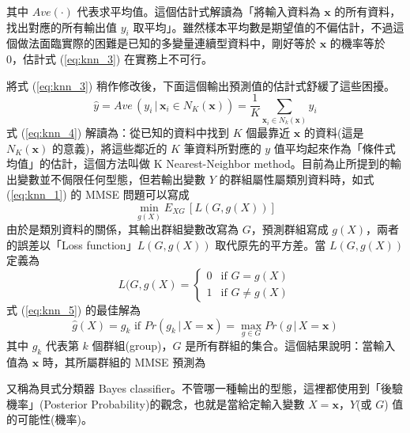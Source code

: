 其中 $Ave(·)$ 代表求平均值。這個估計式解讀為「將輸入資料為 $\mathbf{x}$ 的所有資料，找出對應的所有輸出值 $y_i$ 取平均」。雖然樣本平均數是期望值的不偏估計，不過這個做法面臨實際的困難是已知的多變量連續型資料中，剛好等於 $\mathbf{x}$ 的機率等於 0，估計式 (\ref{eq:knn_3}) 在實務上不可行。

將式 (\ref{eq:knn_3}) 稍作修改後，下面這個輸出預測值的估計式舒緩了這些困擾。
\begin{equation}\label{eq:knn_4}
\hat{y} = Ave\,(y_i\,|\,\mathbf{x}_i \in N_K(\mathbf{x})) = \frac{1}{K} \sum_{\mathbf{x}_i \in N_k(\mathbf{x})} y_i
\end{equation}
式 (\ref{eq:knn_4}) 解讀為：從已知的資料中找到 $K$ 個最靠近 $\mathbf{x}$ 的資料(這是 $N_K(\mathbf{x})$ 的意義)，將這些鄰近的 $K$ 筆資料所對應的 $y$ 值平均起來作為「條件式均值」的估計，這個方法叫做 K Nearest-Neighbor method。目前為止所提到的輸出變數並不侷限任何型態，但若輸出變數 $Y$ 的群組屬性屬類別資料時，如式 (\ref{eq:knn_1}) 的 MMSE 問題可以寫成
\begin{equation}\label{eq:knn_5}
\mathop{\text{min}} \limits_{g(X)} E_{XG}\,[L(G, g(X))]
\end{equation}
由於是類別資料的關係，其輸出群組變數改寫為 $G$，預測群組寫成 $g(X)$，兩者的誤差以「Loss function」$L(G, g(X))$ 取代原先的平方差。當 $L(G, g(X))$ 定義為
\[L(G, g(X) = \begin{cases} 
0  & \mbox{if} \,\,G = g(X)\\ 
1  & \mbox{if} \,\,G \neq g(X) 
\end{cases}\]
式 (\ref{eq:knn_5}) 的最佳解為
\begin{equation}\label{eq:knn_6}
\hat{g}(X) = g_k \,\,\text{if}\,\,Pr(g_k\,|\,X = \mathbf{x}) = \mathop{\text{max}} \limits_{g \in G} Pr(g\,|\,X = \mathbf{x}) 
\end{equation}
其中 $g_k$ 代表第 $k$ 個群組(group)，$G$ 是所有群組的集合。這個結果說明：當輸入值為 $\mathbf{x}$ 時，其所屬群組的 MMSE 預測為

\begin{center}
\end{center}

又稱為貝式分類器 Bayes classifier。不管哪一種輸出的型態，這裡都使用到「後驗機率」(Posterior Probability)的觀念，也就是當給定輸入變數 $X = \mathbf{x}$，$Y$(或 $G$) 值的可能性(機率)。

